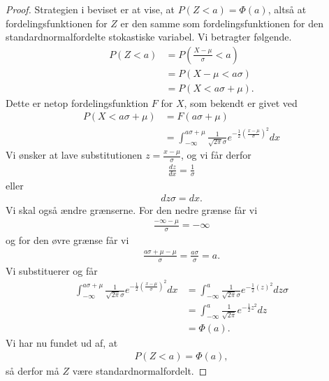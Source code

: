 \begin{proof}
	Strategien i beviset er at vise, at $P(Z<a) = \Phi(a)$, altså at fordelingsfunktionen for $Z$ er den samme som fordelingsfunktionen for den standardnormalfordelte
	stokastiske variabel.
	Vi betragter følgende.
	\begin{align*}
		P(Z < a) &= P(\frac{X-\mu}{\sigma} < a)\\
		&= P(X-\mu < a\sigma)\\
		&= P(X < a\sigma + \mu).
	\end{align*}
	Dette er netop fordelingsfunktion $F$ for $X$, som bekendt er givet ved
	\begin{align*}
		P(X < a\sigma + \mu) &= F(a\sigma + \mu)\\
		&= \int_{-\infty}^{a\sigma + \mu} \frac{1}{\sqrt{2\pi}\sigma}e^{-\frac{1}{2}\left(\frac{x-\mu}{\sigma}\right)^2}dx
	\end{align*}
	Vi ønsker at lave substitutionen $z = \frac{x-\mu}{\sigma}$, og vi får derfor
	\begin{align*}
		\frac{dz}{dx} = \frac{1}{\sigma}
	\end{align*}
	eller 
	\begin{align*}
		dz\sigma = dx.
	\end{align*}
	Vi skal også ændre grænserne. For den nedre grænse får vi
	\begin{align*}
		\frac{-\infty - \mu}{\sigma} = -\infty
	\end{align*}
	og for den øvre grænse får vi
	\begin{align*}
		\frac{a\sigma + \mu - \mu}{\sigma} = \frac{a\sigma}{\sigma} = a.
	\end{align*}
	Vi substituerer og får
	\begin{align*}
		\int_{-\infty}^{a\sigma + \mu} \frac{1}{\sqrt{2\pi}\sigma}e^{-\frac{1}{2}\left(\frac{x-\mu}{\sigma}\right)^2}dx 
		&= \int_{-\infty}^{a} \frac{1}{\sqrt{2\pi}\sigma}e^{-\frac{1}{2}(z)^2}dz \sigma \\
		&= \int_{-\infty}^{a} \frac{1}{\sqrt{2\pi}}e^{-\frac{1}{2}z^2}dz \\
		&= \Phi(a).
	\end{align*}
	Vi har nu fundet ud af, at 
	\begin{align*}
		P(Z < a) = \Phi(a),
	\end{align*}
	så derfor må $Z$ være standardnormalfordelt. 
\end{proof}
